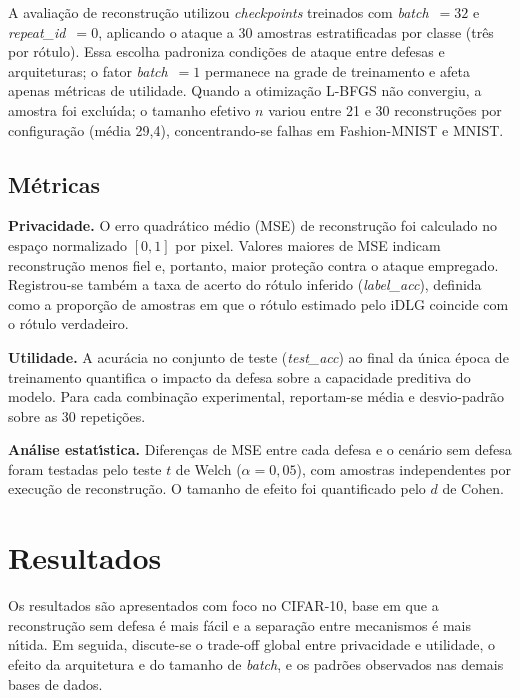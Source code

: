\documentclass[kdmile,a4paper]{kdmile}
\begin{document}
A avalia\c{c}\~{a}o de reconstru\c{c}\~{a}o utilizou \textit{checkpoints} treinados com \textit{batch}~$= 32$ e \textit{repeat\_id}~$= 0$, aplicando o ataque a 30 amostras estratificadas por classe (tr\^{e}s por r\'{o}tulo). Essa escolha padroniza condi\c{c}\~{o}es de ataque entre defesas e arquiteturas; o fator \textit{batch}~$= 1$ permanece na grade de treinamento e afeta apenas m\'{e}tricas de utilidade. Quando a otimiza\c{c}\~{a}o L-BFGS n\~{a}o convergiu, a amostra foi exclu\'{\i}da; o tamanho efetivo $n$ variou entre 21 e 30 reconstru\c{c}\~{o}es por configura\c{c}\~{a}o (m\'{e}dia 29,4), concentrando-se falhas em Fashion-MNIST e MNIST.

\subsection{M\'{e}tricas}

\textbf{Privacidade.} O erro quadr\'{a}tico m\'{e}dio (MSE) de reconstru\c{c}\~{a}o foi calculado no espa\c{c}o normalizado $[0, 1]$ por pixel. Valores maiores de MSE indicam reconstru\c{c}\~{a}o menos fiel e, portanto, maior prote\c{c}\~{a}o contra o ataque empregado. Registrou-se tamb\'{e}m a taxa de acerto do r\'{o}tulo inferido (\textit{label\_acc}), definida como a propor\c{c}\~{a}o de amostras em que o r\'{o}tulo estimado pelo iDLG coincide com o r\'{o}tulo verdadeiro.

\textbf{Utilidade.} A acur\'{a}cia no conjunto de teste (\textit{test\_acc}) ao final da \'{u}nica \'{e}poca de treinamento quantifica o impacto da defesa sobre a capacidade preditiva do modelo. Para cada combina\c{c}\~{a}o experimental, reportam-se m\'{e}dia e desvio-padr\~{a}o sobre as 30 repeti\c{c}\~{o}es.

\textbf{An\'{a}lise estat\'{\i}stica.} Diferen\c{c}as de MSE entre cada defesa e o cen\'{a}rio sem defesa foram testadas pelo teste $t$ de Welch ($\alpha = 0{,}05$), com amostras independentes por execu\c{c}\~{a}o de reconstru\c{c}\~{a}o. O tamanho de efeito foi quantificado pelo $d$ de Cohen.

\section{Resultados}
\label{sec:resultados}

Os resultados s\~{a}o apresentados com foco no CIFAR-10, base em que a reconstru\c{c}\~{a}o sem defesa \'{e} mais f\'{a}cil e a separa\c{c}\~{a}o entre mecanismos \'{e} mais n\'{\i}tida. Em seguida, discute-se o trade-off global entre privacidade e utilidade, o efeito da arquitetura e do tamanho de \textit{batch}, e os padr\~{o}es observados nas demais bases de dados.
\end{document}
